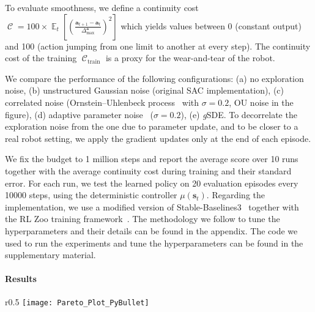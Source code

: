 \documentclass{article}
\newcommand{\E}[2]{\operatorname{\mathbb{E}}_{#1}\left[#2\right]}
\newcommand{\Cont}{\operatorname{\mathcal{C}}}
\newcommand{\state}{\mathbf{s}}
\newcommand{\action}{\mathbf{a}}
\newcommand{\at}{{\action_t}}
\newcommand{\st}{{\state_t}}
\newcommand{\ourSDE}{\textit{g}\textsc{SDE}\xspace}
\newcommand{\sac}{\textsc{SAC}\xspace}
\begin{document}
To evaluate smoothness, we define a continuity cost $\Cont = 100 \times \E{t}{(\frac{\action_{t+1} - \at}{\Delta^{\action}_{\max}})^2}$ which yields values between 0 (constant output) and 100 (action jumping from one limit to another at every step). The continuity cost of the training $\Cont_\mathrm{train}$ is a proxy for the wear-and-tear of the robot.

We compare the performance of the following configurations: (a) no exploration noise, (b) unstructured Gaussian noise (original \sac implementation), (c) correlated noise (Ornstein–Uhlenbeck process~\citep{uhlenbeck1930theory} with $\sigma {=} 0.2$, OU noise in the figure), (d) adaptive parameter noise~\citep{plappert2017parameter} ($\sigma {=} 0.2$), (e) \ourSDE.
To decorrelate the exploration noise from the one due to parameter update, and to be closer to a real robot setting, we apply the gradient updates only at the end of each episode.

We fix the budget to 1 million steps and report the average score over 10 runs together with the average continuity cost during training and their standard error.
For each run, we test the learned policy on 20 evaluation episodes every 10000 steps, using the deterministic controller $\mu(\st)$.
Regarding the implementation,
we use a modified version of Stable-Baselines3~\citep{raffin2019baselines3} together with the RL Zoo training framework~\citep{raffin2020zoo3}.
The methodology we follow to tune the hyperparameters and their details can be found in the appendix.
The code we used to run the experiments and tune the hyperparameters can be found in the supplementary material.



\paragraph{Results}

\begin{wrapfigure}[18]{r}{0.5\textwidth}
    \vspace{-2em}
    \texttt{[image: Pareto\_Plot\_PyBullet]}
    \caption{Normalized return and continuity cost of \sac on 4 PyBullet tasks with different type of exploration. \ourSDE provides a compromise between performance and smoothness.}
    \label{fig:pybullet-pareto}
\end{wrapfigure}
\end{document}
